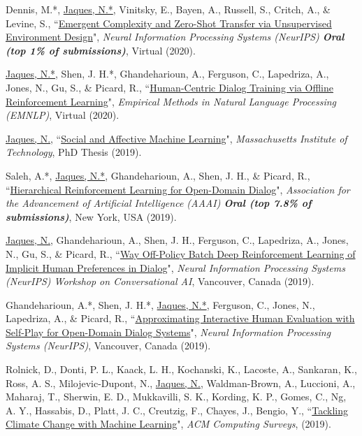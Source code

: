 \documentclass[paper=letter,fontsize=11pt]{scrartcl} %
\newcommand{\PaperEntry}[6]{
        \noindent #1, ``\href{#6}{#2}", \textit{#3}, #4 (#5).}
\begin{document}
\begin{etaremune}
\item \PaperEntry{Dennis, M.*, \underline{Jaques, N.*}, Vinitsky, E., Bayen, A., Russell, S., Critch, A., \& Levine, S.}{Emergent Complexity and Zero-Shot Transfer via Unsupervised Environment Design}{Neural Information Processing Systems (NeurIPS) \textbf{Oral (top 1\% of submissions)}}{Virtual}{2020}{https://arxiv.org/abs/2012.02096}

\item \PaperEntry{\underline{Jaques, N.*}, Shen, J. H.*, Ghandeharioun, A., Ferguson, C., Lapedriza, A., Jones, N., Gu, S., \& Picard, R.}{Human-Centric Dialog Training via Offline Reinforcement Learning}{Empirical Methods in Natural Language Processing (EMNLP)}{Virtual}{2020}{https://arxiv.org/pdf/2010.05848.pdf}

\item \PaperEntry{\underline{Jaques, N.}}{Social and Affective Machine Learning}{Massachusetts Institute of Technology}{PhD Thesis}{2019}{https://www.media.mit.edu/publications/social-and-affective-machine-learning/}

\item \PaperEntry{Saleh, A.*, \underline{Jaques, N.*}, Ghandeharioun, A., Shen, J. H., \& Picard, R.}{Hierarchical Reinforcement Learning for Open-Domain Dialog}{Association for the Advancement of Artificial Intelligence (AAAI) \textbf{Oral (top 7.8\% of submissions)}}{New York, USA}{2019}{https://arxiv.org/abs/1909.07547}

\item \PaperEntry{\underline{Jaques, N.}, Ghandeharioun, A., Shen, J. H., Ferguson, C., Lapedriza, A., Jones, N., Gu, S., \& Picard, R.}{Way Off-Policy Batch Deep Reinforcement Learning of Implicit Human Preferences in Dialog}{Neural Information Processing Systems (NeurIPS) Workshop on Conversational AI}{Vancouver, Canada}{2019}{https://arxiv.org/abs/1907.00456}

\item \PaperEntry{Ghandeharioun, A.*, Shen, J. H.*, \underline{Jaques, N.*}, Ferguson, C., Jones, N., Lapedriza, A., \& Picard, R.}{Approximating Interactive Human Evaluation with Self-Play for Open-Domain Dialog Systems}{Neural Information Processing Systems (NeurIPS)}{Vancouver, Canada}{2019}{https://arxiv.org/abs/1906.09308}

\item \PaperEntry{Rolnick, D., Donti, P. L., Kaack, L. H., Kochanski, K., Lacoste, A., Sankaran, K., Ross, A. S., Milojevic-Dupont, N., \underline{Jaques, N.}, Waldman-Brown, A., Luccioni, A., Maharaj, T., Sherwin, E. D., Mukkavilli, S. K., Kording, K. P., Gomes, C., Ng, A. Y., Hassabis, D., Platt, J. C., Creutzig, F., Chayes, J., Bengio, Y.}{Tackling Climate Change with Machine Learning}{ACM Computing Surveys}{}{2019}{https://arxiv.org/abs/1906.05433}


\end{etaremune}
\end{document}
